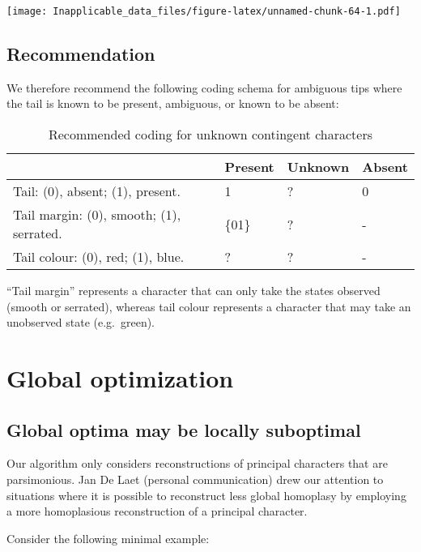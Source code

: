 \documentclass[]{book}
\theoremstyle{definition}
\theoremstyle{definition}
\theoremstyle{definition}
\theoremstyle{remark}
\begin{document}
\texttt{[image: Inapplicable\_data\_files/figure-latex/unnamed-chunk-64-1.pdf]}

\section{Recommendation}\label{recommendation}

We therefore recommend the following coding schema for ambiguous tips
where the tail is known to be present, ambiguous, or known to be absent:

\begin{table}

\caption{\label{tab:unnamed-chunk-65}Recommended coding for unknown contingent characters}
\centering
\begin{tabular}[t]{l|l|l|l}
\hline
  & Present & Unknown & Absent\\
\hline
Tail: (0), absent; (1), present. & 1 & ? & 0\\
\hline
Tail margin: (0), smooth; (1), serrated. & \{01\} & ? & -\\
\hline
Tail colour: (0), red; (1), blue. & ? & ? & -\\
\hline
\end{tabular}
\end{table}

``Tail margin'' represents a character that can only take the states
observed (smooth or serrated), whereas tail colour represents a
character that may take an unobserved state (e.g.~green).

\chapter{Global optimization}\label{global}

\section{Global optima may be locally
suboptimal}\label{global-optima-may-be-locally-suboptimal}

Our algorithm only considers reconstructions of principal characters
that are parsimonious. Jan De Laet (personal communication) drew our
attention to situations where it is possible to reconstruct less global
homoplasy by employing a more homoplasious reconstruction of a principal
character.

Consider the following minimal example:
\end{document}
